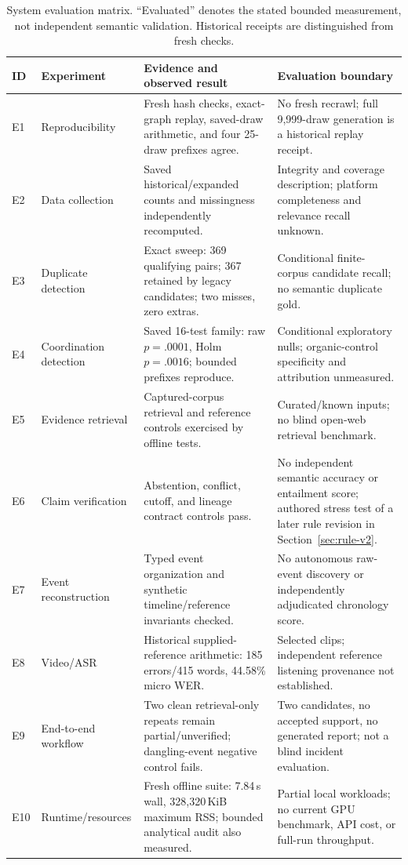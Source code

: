 \begin{table}[t]
\centering
\small
\caption{System evaluation matrix. ``Evaluated'' denotes the stated bounded measurement, not independent semantic validation. Historical receipts are distinguished from fresh checks.}
\label{tab:evaluation}
\begin{tabularx}{\textwidth}{@{}p{}p{}XX@{}}
\toprule
ID & Experiment & Evidence and observed result & Evaluation boundary \\
\midrule
E1 & Reproducibility & Fresh hash checks, exact-graph replay, saved-draw arithmetic, and four 25-draw prefixes agree. & No fresh recrawl; full 9,999-draw generation is a historical replay receipt. \\
E2 & Data collection & Saved historical/expanded counts and missingness independently recomputed. & Integrity and coverage description; platform completeness and relevance recall unknown. \\
E3 & Duplicate detection & Exact sweep: 369 qualifying pairs; 367 retained by legacy candidates; two misses, zero extras. & Conditional finite-corpus candidate recall; no semantic duplicate gold. \\
E4 & Coordination detection & Saved 16-test family: raw $p=.0001$, Holm $p=.0016$; bounded prefixes reproduce. & Conditional exploratory nulls; organic-control specificity and attribution unmeasured. \\
E5 & Evidence retrieval & Captured-corpus retrieval and reference controls exercised by offline tests. & Curated/known inputs; no blind open-web retrieval benchmark. \\
E6 & Claim verification & Abstention, conflict, cutoff, and lineage contract controls pass. & No independent semantic accuracy or entailment score; authored stress test of a later rule revision in Section~\ref{sec:rule-v2}. \\
E7 & Event reconstruction & Typed event organization and synthetic timeline/reference invariants checked. & No autonomous raw-event discovery or independently adjudicated chronology score. \\
E8 & Video/ASR & Historical supplied-reference arithmetic: 185 errors/415 words, 44.58\% micro WER. & Selected clips; independent reference listening provenance not established. \\
E9 & End-to-end workflow & Two clean retrieval-only repeats remain partial/unverified; dangling-event negative control fails. & Two candidates, no accepted support, no generated report; not a blind incident evaluation. \\
E10 & Runtime/resources & Fresh offline suite: 7.84\,s wall, 328,320\,KiB maximum RSS; bounded analytical audit also measured. & Partial local workloads; no current GPU benchmark, API cost, or full-run throughput. \\
\bottomrule
\end{tabularx}
\end{table}

